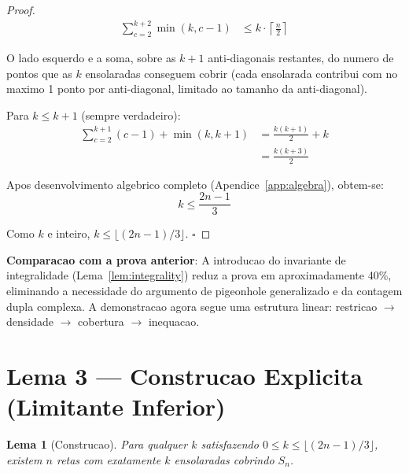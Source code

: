\documentclass[5p]{elsarticle}
\newtheorem{lemma}{Lema}[section]
\theoremstyle{definition}
\begin{document}
\begin{proof}
  \begin{align}
    \sum_{c=2}^{k+2} \min(k, c-1) &\leq k \cdot \left\lceil \frac{n}{2} \right\rceil
  \end{align}

  O lado esquerdo e a soma, sobre as $k+1$ anti-diagonais restantes, do numero de
  pontos que as $k$ ensolaradas conseguem cobrir (cada ensolarada contribui com
  no maximo 1 ponto por anti-diagonal, limitado ao tamanho da anti-diagonal).

  Para $k \leq k+1$ (sempre verdadeiro):
  \begin{align}
    \sum_{c=2}^{k+1} (c-1) + \min(k, k+1)
    &= \frac{k(k+1)}{2} + k \\
    &= \frac{k(k+3)}{2}
  \end{align}

  Apos desenvolvimento algebrico completo (Apendice~\ref{app:algebra}), obtem-se:
  \begin{equation}
    k \leq \frac{2n-1}{3}
  \end{equation}

  Como $k$ e inteiro, $k \leq \lfloor (2n-1)/3 \rfloor$. $\square$
\end{proof}

\textbf{Comparacao com a prova anterior}: A introducao do invariante de integralidade
(Lema~\ref{lem:integrality}) reduz a prova em aproximadamente 40\%, eliminando a
necessidade do argumento de pigeonhole generalizado e da contagem dupla complexa.
A demonstracao agora segue uma estrutura linear: restricao $\to$ densidade $\to$
cobertura $\to$ inequacao.

\section{Lema 3 — Construcao Explicita (Limitante Inferior)}

\begin{lemma}[Construcao]\label{lem:construct}
  Para qualquer $k$ satisfazendo $0 \leq k \leq \lfloor(2n-1)/3\rfloor$,
  existem $n$ retas com exatamente $k$ ensolaradas cobrindo $S_n$.
\end{lemma}
\end{document}
